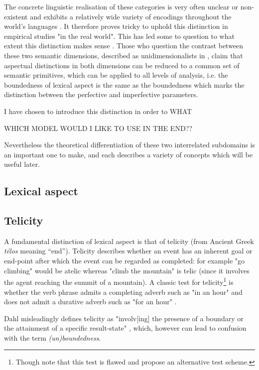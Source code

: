 The concrete linguistic realisation of these categories is very often unclear or non-existent and exhibits a relatively wide variety of encodings throughout the world’s languages \citep{Dahl1985TenseAA}. It therefore proves tricky to uphold this distinction in empirical studies "in the real world". This has led some to question to what extent this distinction makes sense \citep{Sasse2002RecentAI}. Those who question the contrast between these two semantic dimensions, described as unidimensionalists in \citet{Sasse2002RecentAI}, claim that aspectual distinctions in both dimensions can be reduced to a common set of semantic primitives, which can be applied to all levels of analysis, i.e. the boundedness of lexical aspect is the same as the boundedness which marks the distinction between the perfective and imperfective parameters. 

I have chosen to introduce this distinction in order to WHAT

WHICH MODEL WOULD I LIKE TO USE IN THE END??

Nevertheless the theoretical differentiation of these two interrelated subdomains is an important one to make, and each describes a variety of concepts which will be useful later.

\subsection{Lexical aspect}
\subsection*{Telicity}
A fundamental distinction of lexical aspect is that of telicity (from Ancient Greek \emph{télos} meaning “end”). Telicity describes whether an event has an inherent goal or end-point after which the event can be regarded as completed: for example "go climbing" would be atelic whereas "climb the mountain" is telic (since it involves the agent reaching the summit of a mountain). A classic test for telicity\footnote{Though \citet{XiaoMcenery+2006+1+21} note that this test is flawed and propose an alternative test scheme.} is whether the verb phrase admits a completing adverb such as "in an hour" and does not admit a durative adverb such as "for an hour" \citep{Krifka1998TheOO}.

Dahl misleadingly defines telicity as "involv[ing] the presence of a boundary or the attainment of a specific result-state" \citep{DAHL2015210}, which, however can lead to confusion with the term \emph{(un)boundedness}.
